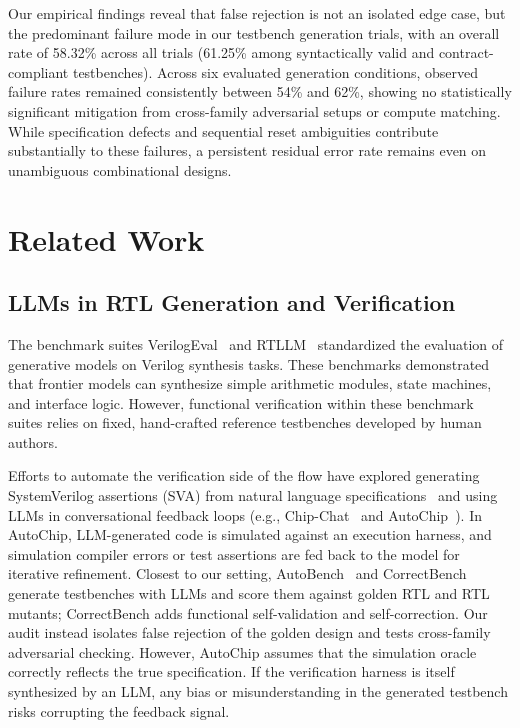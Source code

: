 \documentclass[conference]{IEEEtran}
\begin{document}
Our empirical findings reveal that false rejection is not an isolated edge case, but the predominant failure mode in our testbench generation trials, with an overall rate of 58.32\% across all trials (61.25\% among syntactically valid and contract-compliant testbenches). Across six evaluated generation conditions, observed failure rates remained consistently between 54\% and 62\%, showing no statistically significant mitigation from cross-family adversarial setups or compute matching. While specification defects and sequential reset ambiguities contribute substantially to these failures, a persistent residual error rate remains even on unambiguous combinational designs.

\section{Related Work}
\subsection{LLMs in RTL Generation and Verification}
The benchmark suites VerilogEval~\cite{liu2023verilogeval} and RTLLM~\cite{lu2024rtllm} standardized the evaluation of generative models on Verilog synthesis tasks. These benchmarks demonstrated that frontier models can synthesize simple arithmetic modules, state machines, and interface logic. However, functional verification within these benchmark suites relies on fixed, hand-crafted reference testbenches developed by human authors.


Efforts to automate the verification side of the flow have explored generating SystemVerilog assertions (SVA) from natural language specifications~\cite{yan2025assertllm} and using LLMs in conversational feedback loops (e.g., Chip-Chat~\cite{blocklove2023chipchat} and AutoChip~\cite{thakur2023autochip}). In AutoChip, LLM-generated code is simulated against an execution harness, and simulation compiler errors or test assertions are fed back to the model for iterative refinement. Closest to our setting, AutoBench~\cite{qiu2024autobench} and CorrectBench~\cite{qiu2024correctbench} generate testbenches with LLMs and score them against golden RTL and RTL mutants; CorrectBench adds functional self-validation and self-correction. Our audit instead isolates false rejection of the golden design and tests cross-family adversarial checking. However, AutoChip assumes that the simulation oracle correctly reflects the true specification. If the verification harness is itself synthesized by an LLM, any bias or misunderstanding in the generated testbench risks corrupting the feedback signal.
\end{document}
